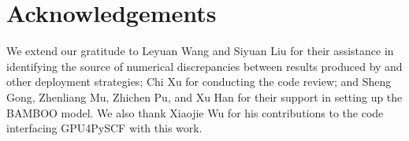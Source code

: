 \section*{Acknowledgements}

We extend our gratitude
to Leyuan Wang and Siyuan Liu
for their assistance in identifying the source
of numerical discrepancies between results produced
by \texttt{\torchcompile} and other deployment strategies;
Chi Xu for conducting the code review;
and Sheng Gong, Zhenliang Mu, Zhichen Pu, and Xu Han
for their support in setting up the BAMBOO model.
We also thank Xiaojie Wu
for his contributions to the code interfacing GPU4PySCF with this work.
